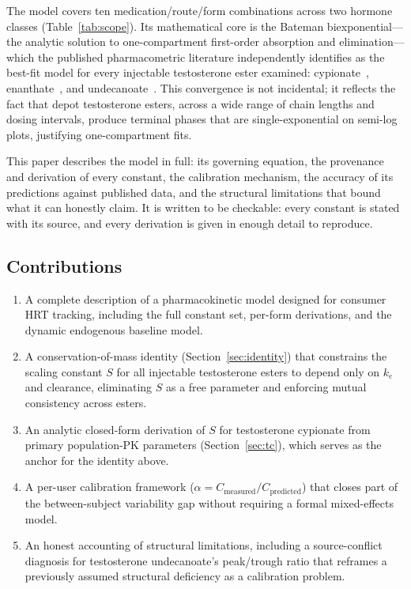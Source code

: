 \documentclass[11pt,a4paper]{article}
\begin{document}
The model covers ten medication/route/form combinations across two
hormone classes (Table~\ref{tab:scope}). Its mathematical core is the
Bateman biexponential---the analytic solution to one-compartment
first-order absorption and elimination---which the published
pharmacometric literature independently identifies as the best-fit model
for every injectable testosterone ester examined: cypionate~\cite{bi2018},
enanthate~\cite{ichihara2020}, and
undecanoate~\cite{pastuszak2021}. This convergence is not incidental;
it reflects the fact that depot testosterone esters, across a wide range
of chain lengths and dosing intervals, produce terminal phases that are
single-exponential on semi-log plots, justifying one-compartment fits.

This paper describes the model in full: its governing equation, the
provenance and derivation of every constant, the calibration mechanism,
the accuracy of its predictions against published data, and the
structural limitations that bound what it can honestly claim. It is
written to be checkable: every constant is stated with its source, and
every derivation is given in enough detail to reproduce.

\subsection{Contributions}

\begin{enumerate}[nosep,leftmargin=1.4em]
\item A complete description of a pharmacokinetic model designed for
  consumer HRT tracking, including the full constant set, per-form
  derivations, and the dynamic endogenous baseline model.
\item A conservation-of-mass identity (Section~\ref{sec:identity}) that
  constrains the scaling constant $S$ for all injectable testosterone
  esters to depend only on $k_e$ and clearance, eliminating $S$ as a
  free parameter and enforcing mutual consistency across esters.
\item An analytic closed-form derivation of $S$ for testosterone
  cypionate from primary population-PK parameters
  (Section~\ref{sec:tc}), which serves as the anchor for the identity
  above.
\item A per-user calibration framework ($\alpha = C_{\text{measured}} /
  C_{\text{predicted}}$) that closes part of the between-subject
  variability gap without requiring a formal mixed-effects model.
\item An honest accounting of structural limitations, including a
  source-conflict diagnosis for testosterone undecanoate's peak/trough
  ratio that reframes a previously assumed structural deficiency as a
  calibration problem.
\end{enumerate}
\end{document}
